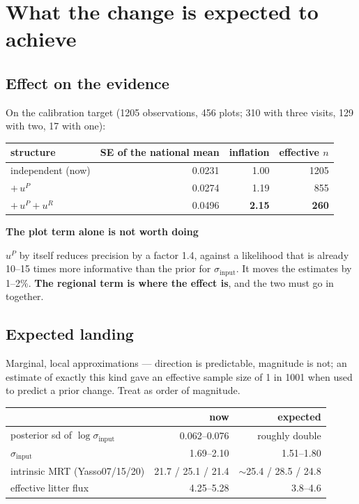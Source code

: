 \documentclass[11pt]{article}
\newenvironment{warnbox}[1][]{%
  \begin{leftbar}\noindent\textcolor{red!60!black}{\textbf{\small #1}}\par\vspace{0.3em}\small}{\end{leftbar}}
\begin{document}
\section{What the change is expected to achieve}

\subsection{Effect on the evidence}

On the calibration target (1205 observations, 456 plots; 310 with three visits,
129 with two, 17 with one):

\begin{center}
\begin{tabular}{lrrr}
\toprule
structure & SE of the national mean & inflation & effective $n$ \\
\midrule
independent (now) & 0.0231 & 1.00 & 1205 \\
$+\,u^{P}$        & 0.0274 & 1.19 & 855 \\
$+\,u^{P}+u^{R}$  & 0.0496 & \textbf{2.15} & \textbf{260} \\
\bottomrule
\end{tabular}
\end{center}

\begin{warnbox}[The plot term alone is not worth doing]
$u^{P}$ by itself reduces precision by a factor 1.4, against a likelihood that is
already 10--15 times more informative than the prior for $\sigma_{\text{input}}$. It
moves the estimates by 1--2\%. \textbf{The regional term is where the effect is}, and
the two must go in together.
\end{warnbox}

\subsection{Expected landing}

Marginal, local approximations --- direction is predictable, magnitude is not; an
estimate of exactly this kind gave an effective sample size of 1 in 1001 when used
to predict a prior change. Treat as order of magnitude.

\begin{center}
\begin{tabular}{lrr}
\toprule
 & now & expected \\
\midrule
posterior sd of $\log\sigma_{\text{input}}$ & 0.062--0.076 & roughly double \\
$\sigma_{\text{input}}$ & 1.69--2.10 & 1.51--1.80 \\
intrinsic MRT (Yasso07/15/20) & 21.7 / 25.1 / 21.4 & $\sim$25.4 / 28.5 / 24.8 \\
effective litter flux & 4.25--5.28 & 3.8--4.6 \\
\bottomrule
\end{tabular}
\end{center}
\end{document}
